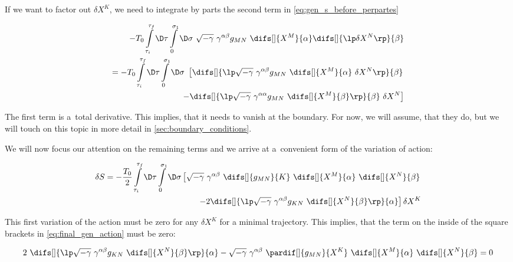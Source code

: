 \noindent
If we want to factor out $\delta X^{K}$, we need to integrate by parts the second term in \cref{eq:gen_s_before_perpartes}


\begin{equation}
\label{eq:per_partes}
    \begin{aligned}
     - T_0 \int\limits_{\tau_i}^{\tau_f} \D \tau \int\limits_{0}^{\sigma_1} \D \sigma ~ \sqrt{-\gamma} ~ \gamma^{\alpha \beta} g_{M N} ~ \difs[] {X^{M}} {\alpha} \difs[] {\lp \delta X^{N}\rp} {\beta} \\
     = - T_0 \int\limits_{\tau_i}^{\tau_f} \D \tau \int\limits_{0}^{\sigma_1} \D \sigma ~ \left[
     \difs[] {\lp \sqrt{-\gamma} ~ \gamma^{\alpha \beta} g_{M N} ~ \difs[] {X^{M}} {\alpha} ~ \delta X^{N} \rp} {\beta} \right. \\
     \left. - \difs[] {\lp \sqrt{-\gamma} ~ \gamma^{\alpha \alpha} g_{M N} ~ \difs[] {X^{M}} {\beta} \rp} {\beta}  ~ \delta X^{N}
     \right] 
     \end{aligned}
\end{equation}

\noindent
The first term is a~total derivative. This implies, that it needs to vanish at the boundary. For now, we will assume, that they do, but we will touch on this topic in more detail in \cref{sec:boundary_conditions}. 

We will now focus our attention on the remaining terms and we arrive at a~convenient form of the variation of action:

\begin{equation}
\label{eq:final_gen_action}
\begin{aligned}
    \delta S = - \frac{T_0}{2} \int\limits_{\tau_i}^{\tau_f} \D \tau \int\limits_{0}^{\sigma_1} 
    \D \sigma  \left[ \sqrt{-\gamma} ~ \gamma^{\alpha \beta} ~
    \difs[] {g_{M N}} {K} ~ \difs[] {X^{M}} {\alpha} ~ \difs[] {X^{N}} {\beta} \right. \\
    \left. -2 \difs[] {\lp \sqrt{-\gamma} ~ \gamma^{\alpha \beta} g_{K N} ~ \difs[] {X^{N}} {\beta} \rp} {\alpha} \right] \delta X^{K}
\end{aligned}
\end{equation}

\noindent
This first variation of the action must be zero for any $\delta X^{K}$ for a minimal trajectory. This implies, that the term on the inside of the square brackets in \cref{eq:final_gen_action} must be zero:

\begin{equation}
\label{eq:EL}
        2 ~ \difs[] {\lp \sqrt{-\gamma} ~ \gamma^{\alpha \beta} g_{K N} ~ \difs[] {X^{N}} {\beta} \rp} {\alpha}  - \sqrt{-\gamma} ~\gamma^{\alpha \beta} ~ \pardif[] {g_{M N}} {X^{K}} ~ \difs[] {X^{M}} {\alpha} ~ \difs[] {X^{N}} {\beta} = 0
\end{equation}

